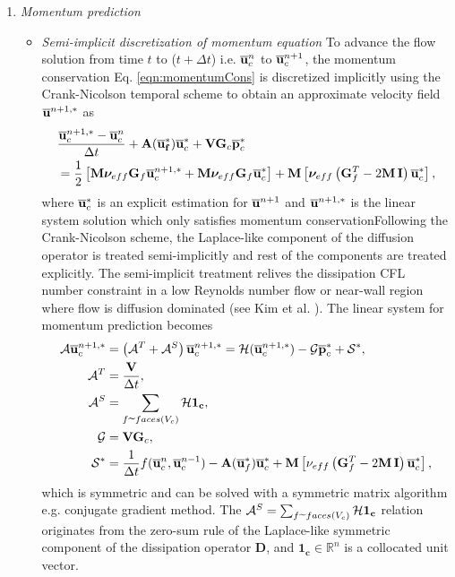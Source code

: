 \begin{enumerate}

\item \textit{Momentum prediction} 

\begin{itemize}

\item \textit{Semi-implicit discretization of momentum equation}
 To advance the flow solution from time $t$ to ($ t+ \Delta t $) i.e. $\overline{\mathbf{u}}_c^{n} $ to $\overline{\mathbf{u}}_c^{n+1} $, the momentum conservation Eq. \eqref{eqn:momentumCons} is discretized implicitly using the Crank-Nicolson temporal scheme to obtain an approximate velocity field $\overline{\mathbf{u}}^{n+1,*}$ as
\begin{align}
\begin{split}
&\frac{\overline{\mathbf{u}}_c^{n+1,*} - \overline{\mathbf{u}}_c^{n} }{\Delta t}
+ \mathbf{A}( \mathbf{\overline{\mathbf{u}}_f^*}) {\overline{\mathbf{u}}_c^*} 
+ \mathbf{V} \mathbf{G}_c \overline{\mathbf{p}}_c^*
\\
&=\frac{1}{2} \left[ 
 \mathbf{M} \boldsymbol{\nu}_{eff} \mathbf{G}_f {\overline{\mathbf{u}}_c^{n+1,*}} 
 + \mathbf{M} \boldsymbol{\nu}_{eff} \mathbf{G}_f {\overline{\mathbf{u}}_c^*}
\right]
+ \mathbf{M} \left[ \boldsymbol{\nu}_{eff} \left( \mathbf{G}_f^T - 2\mathbf{M}\,\mathbf{I} \right) {\overline{\mathbf{u}}_c^*} \right],
\end{split}
\end{align}
 where $\overline{\mathbf{u}}_c^{*}$ is an explicit estimation for $\overline{\mathbf{u}}^{n+1}$ and $\overline{\mathbf{u}}^{n+1, *}$ is the linear system solution which only satisfies momentum conservationFollowing the Crank-Nicolson scheme, the Laplace-like component of the diffusion operator is treated semi-implicitly and rest of the components are treated explicitly. The semi-implicit treatment relives the dissipation CFL number constraint in a low Reynolds number flow or near-wall region where flow is diffusion dominated (see Kim et al. \cite{kim1985}). The linear system for momentum prediction becomes
\begin{align}
\begin{split}
\mathcal{A}\avb{u}_c^{n+1,*} &= \left( \mathcal{A}^T + \mathcal{A}^S \right)\avb{u}_c^{n+1,*} = \mathcal{H}(\avb{u}_c^{n+1,*}) -\mathcal{G}\avb{p}_c^* + \mathcal{S}^{*},
\\
\mathcal{A}^T &= \frac{\mathbf{V}}{\Delta t},
\\
\mathcal{A}^S &= \sumFV \mathcal{H}\mathbf{1_c},
\\
\mathcal{G} &= \mathbf{V} \mathbf{G}_c,
\\
\mathcal{S}^{*} &= \frac{1}{\Delta t} f(\avb{u}_c^{n}, \avb{u}_c^{n-1})  -\mathbf{A}(\avb{u}_f^*) {\avb{u}_c^*} + \mathbf{M} \left[ \nu_{eff} \left( \mathbf{G}_f^T - 2\mathbf{M}\,\mathbf{I} \right) {\avb{u}_c^*} \right],
\label{eqn:linSysMomApprox}
\end{split}
\end{align}
which is symmetric and can be solved with a symmetric matrix algorithm e.g. conjugate gradient method. The $\mathcal{A}^S = \sumFV \mathcal{H}\mathbf{1_c} $ relation originates from the zero-sum rule \cite[Sec. 8.2]{moukalled2015} of the Laplace-like symmetric component of the dissipation operator $\mathbf{D}$, and $\mathbf{1_c} \in \mathbb{R}^n$ is a collocated unit vector.
 

\end{itemize}
\end{enumerate}
